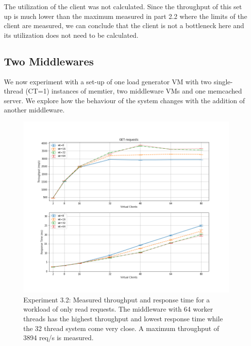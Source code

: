 \documentclass[11pt,a4paper]{article}
\begin{document}
The utilization of the client was not calculated. Since the throughput of this set up is much lower than the maximum measured in part 2.2 where the limits of the client are measured, we can conclude that the client is not a bottleneck here and its utilization does not need to be calculated.

\pagebreak
\subsection{Two Middlewares}
We now experiment with a set-up of one load generator VM with two single-thread (CT=1) instances of memtier, two middleware VMs and one memcached server. We explore how the behaviour of the system changes with the addition of another middleware.

\begin{figure}
\centering
\includegraphics[width=.9\textwidth]{32/32_get_requests}
\caption{Experiment 3.2: Measured throughput and response time for a workload of only read requests. The middleware with 64 worker threads has the highest throughput and lowest response time while the 32 thread system come very close. A maximum throughput of 3894 req/s is measured.}
\label{fig:32_get}
\end{figure}
\end{document}
